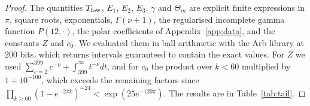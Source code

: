 \documentclass[11pt]{amsart}
\theoremstyle{definition}
\begin{document}
\begin{proof}
The quantities $T_{\rm low}$, $E_1$, $E_2$, $E_3$, $\gamma$ and $\Theta_m$ are explicit finite expressions in $\pi$, square roots, exponentials, $\Gamma(\nu+1)$, the regularised incomplete gamma function $P(12,\cdot)$, the polar coefficients of Appendix~\ref{app:data}, and the constants $Z$ and $c_0$. We evaluated them in ball arithmetic with the Arb library \cite{Joh17} at $200$ bits, which returns intervals guaranteed to contain the exact values. For $Z$ we used $\sum_{c=2}^{399}c^{-\nu}+\int_{399}^\infty t^{-\nu}dt$, and for $c_0$ the product over $k<60$ multiplied by $1+10^{-100}$, which exceeds the remaining factors since $\prod_{k\ge60}(1-e^{-2\pi k})^{-24}<\exp(25e^{-120\pi})$. The results are in Table~\ref{tab:tail}.
\end{proof}
\end{document}
